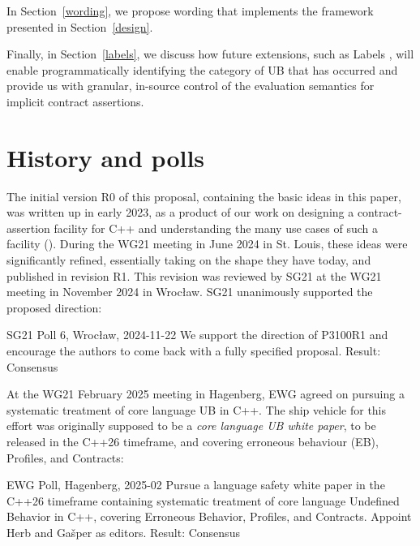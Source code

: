 In Section~\ref{wording}, we propose wording that implements the framework presented in Section~\ref{design}.

Finally, in Section~\ref{labels}, we discuss how future extensions, such as Labels \cite{P3400R1},
will enable programmatically identifying the category of UB that has occurred and provide us with granular, in-source control of the evaluation semantics for implicit contract assertions.

\section{History and polls}
\label{history}

The initial version R0 of this proposal, containing the basic ideas in this paper, was written up in early 2023, as a product of our work on designing a contract-assertion facility for C++ and understanding the many use cases of such a facility  (\cite{P1995R1}). During the WG21 meeting in June 2024 in St. Louis, these ideas were significantly refined, essentially taking on the shape they have today, and published in revision R1. This revision was reviewed by SG21 at the WG21 meeting in November 2024 in Wroc\l aw. SG21 unanimously supported the proposed direction:

\vspace{2mm}
\begin{wgpoll}{{SG21 Poll 6, Wroc{\l}aw, 2024-11-22}}
We support the direction of P3100R1 and encourage the authors to come back with a fully specified proposal.
Result: Consensus
\end{wgpoll}
\vspace{2mm}

At the WG21 February 2025 meeting in Hagenberg, EWG agreed on pursuing a systematic
treatment of core language UB in C++. The ship vehicle for this effort was originally supposed to be a \emph{core language UB white paper}, to be released in the C++26 timeframe, and covering erroneous behaviour (EB), Profiles, and Contracts:

\vspace{2mm}
\begin{wgpoll}{{EWG Poll, Hagenberg, 2025-02}}
Pursue a language safety white paper in the C++26 timeframe containing systematic
treatment of core language Undefined Behavior in C++, covering Erroneous Behavior,
Profiles, and Contracts. Appoint Herb and Ga\v sper as editors.
Result: Consensus
\end{wgpoll}
\vspace{2mm}

